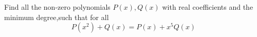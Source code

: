 Find all the non-zero polynomials $P(x),Q(x)$ with real coefficients and the minimum degree,such that for all 
\[ P(x^2)+Q(x)=P(x)+x^5Q(x) \]
